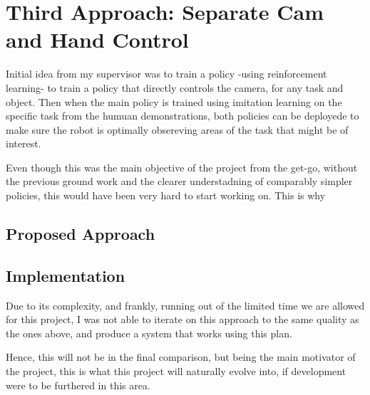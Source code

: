 \section{Third Approach: Separate Cam and Hand Control}
Initial idea from my supervisor was to train a policy -using reinforcement learning- to train a policy that directly controls the camera, for any task and object. Then when the main policy is trained using imitation learning on the specific task from the humuan demonstrations, both policies can be deployede to make sure the robot is optimally obsereving areas of the task that might be of interest.

Even though this was the main objective of the project from the get-go, without the previous ground work and the clearer understadning of comparably simpler policies, this would have been very hard to start working on. This is why 

\subsection{Proposed Approach}


\subsection{Implementation}
Due to its complexity, and frankly, running out of the limited time we are allowed for this project, I was not able to iterate on this approach to the same quality as the ones above, and produce a system that works using this plan.

Hence, this will not be in the final comparison, but being the main motivator of the project, this is what this project will naturally evolve into, if development were to be furthered in this area.

